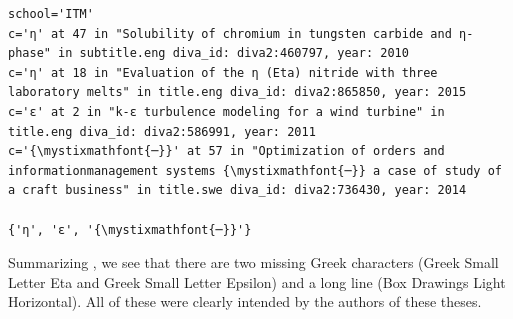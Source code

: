 \documentclass[12pt, twoside]{article}
\begin{document}
\begin{Verbatim}[breaklines=true, commandchars=\\\{\}]
school='ITM'
c='η' at 47 in "Solubility of chromium in tungsten carbide and η-phase" in subtitle.eng diva_id: diva2:460797, year: 2010
c='η' at 18 in "Evaluation of the η (Eta) nitride with three laboratory melts" in title.eng diva_id: diva2:865850, year: 2015
c='ε' at 2 in "k-ε turbulence modeling for a wind turbine" in title.eng diva_id: diva2:586991, year: 2011
c='{\mystixmathfont{─}}' at 57 in "Optimization of orders and informationmanagement systems {\mystixmathfont{─}} a case of study of a craft business" in title.swe diva_id: diva2:736430, year: 2014

{'η', 'ε', '{\mystixmathfont{─}}'}
\end{Verbatim}
\FloatBarrier
Summarizing , we see that there are two missing Greek characters (Greek Small Letter Eta and Greek Small Letter Epsilon) and a long line (\ie Box Drawings Light Horizontal). All of these were clearly intended by the authors of these theses.
\clearpage
\begin{lstlisting}[style=latexExampleForAuthors,  escapechar=|, 
caption={Part of the output about characters missing from Figtree that are actually used in DiVA in English and Swedish titles and subtitles - for the SCI school.},
label=lst:missingFigtreeSCI]
\end{lstlisting}
\end{document}

